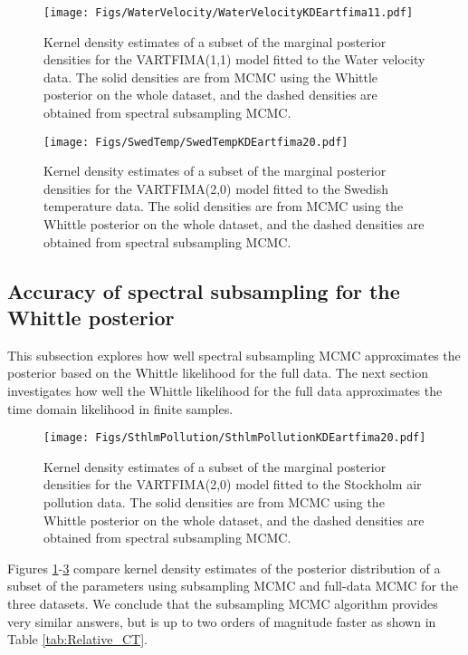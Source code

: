 \documentclass[11pt,english,oneside]{amsart}
\numberwithin{equation}{section}
\theoremstyle{plain}
\numberwithin{equation}{section}
\begin{document}
\begin{figure}
    \texttt{[image: Figs/WaterVelocity/WaterVelocityKDEartfima11.pdf]}
    \caption{Kernel density estimates of a subset of the marginal posterior densities for the VARTFIMA(1,1) model fitted to the Water velocity data. The solid densities are from MCMC using the Whittle posterior on the whole dataset, and the dashed densities are obtained from spectral subsampling MCMC.}\label{fig:WaterVelocityKDEartfima11}
\end{figure}

\begin{figure}
    \texttt{[image: Figs/SwedTemp/SwedTempKDEartfima20.pdf]}
    \caption{Kernel density estimates of a subset of the marginal posterior densities for the VARTFIMA(2,0) model fitted to the Swedish temperature data. The solid densities are from MCMC using the Whittle posterior on the whole dataset, and the dashed densities are obtained from spectral subsampling MCMC.}\label{fig:SwedTempKDEartfima20}
\end{figure}

\subsection{Accuracy of spectral subsampling for the Whittle posterior}
This subsection explores how well spectral subsampling MCMC approximates the posterior based on the Whittle likelihood for the full data. The next section investigates how well the Whittle likelihood for the full data approximates the time domain likelihood in finite samples.

\begin{figure}
    \texttt{[image: Figs/SthlmPollution/SthlmPollutionKDEartfima20.pdf]}
    \caption{Kernel density estimates of a subset of the marginal posterior densities for the VARTFIMA(2,0) model fitted to the Stockholm air pollution data. The solid densities are from MCMC using the Whittle posterior on the whole dataset, and the dashed densities are obtained from spectral subsampling MCMC.}\label{fig:SthlmPollutionKDEartfima20}
\end{figure}

Figures \ref{fig:WaterVelocityKDEartfima11}-\ref{fig:SthlmPollutionKDEartfima20} compare kernel density estimates of the posterior distribution of a subset of the parameters using subsampling MCMC and full-data MCMC for the three datasets. We conclude that the subsampling MCMC algorithm provides very similar answers, but is up to two orders of magnitude faster as shown in Table \ref{tab:Relative_CT}.
\end{document}

